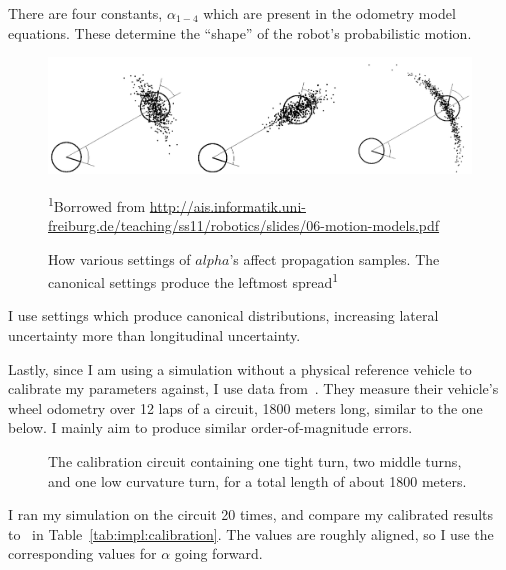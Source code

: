 \documentclass[a4paper,12pt,twoside,openright]{report}
\begin{document}
There are four constants, $\alpha_{1-4}$ which are present in the odometry
model equations. These determine the ``shape'' of the robot's probabilistic
motion.

\begin{figure}
    \includegraphics[width=\linewidth]{figures/implementation/ekf/noise_params.png}
\caption[Noise Parameter Settings]{How various settings of $alpha$'s affect propagation samples. The canonical settings produce the leftmost spread\textsuperscript{1}}
    \tiny\textsuperscript{1}Borrowed from \url{http://ais.informatik.uni-freiburg.de/teaching/ss11/robotics/slides/06-motion-models.pdf}
    \label{fig:ekf:noiseparams}
\end{figure}

I use settings which produce canonical distributions, increasing lateral uncertainty more
than longitudinal uncertainty.


Lastly, since I am using a simulation without a physical reference vehicle to
calibrate my parameters against, I use data from~\cite{vivacqua2017low}. 
They measure their vehicle's wheel odometry over 12 laps of a circuit, 1800 meters long, similar
to the one below. I mainly aim to produce similar order-of-magnitude errors.

\begin{figure}
    \begin{center}
        
    \end{center}
    \caption[Calibration Circuit]{The calibration circuit containing one tight turn, two middle turns, and one low curvature turn, for a total length of about 1800 meters.}
    \label{fig:ekf:noiseparams}
\end{figure}

I ran my simulation on the circuit 20 times, and compare my calibrated results to~\cite{vivacqua2017low} in
Table~\ref{tab:impl:calibration}. The values are roughly aligned, so I use
the corresponding values for $\alpha$ going forward.
\end{document}
